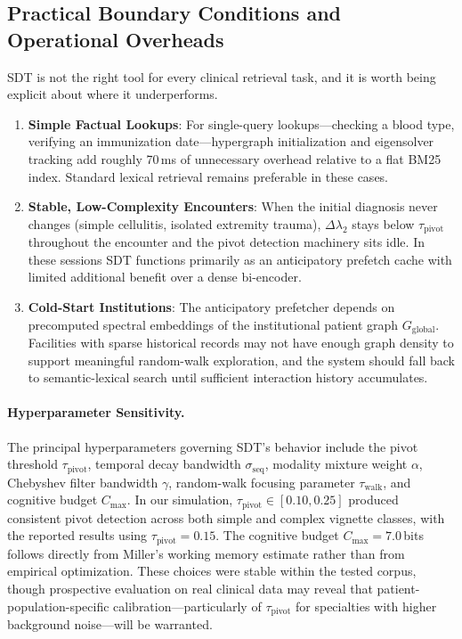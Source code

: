 \documentclass[10pt, onecolumn]{article}
\begin{document}
\subsection{Practical Boundary Conditions and Operational Overheads}

SDT is not the right tool for every clinical retrieval task, and it is worth being explicit about where it underperforms.
\begin{enumerate}[(1)]
  \item \textbf{Simple Factual Lookups}: For single-query lookups---checking a blood type, verifying an immunization date---hypergraph initialization and eigensolver tracking add roughly 70\,ms of unnecessary overhead relative to a flat BM25 index. Standard lexical retrieval remains preferable in these cases.
  \item \textbf{Stable, Low-Complexity Encounters}: When the initial diagnosis never changes (simple cellulitis, isolated extremity trauma), $\Delta \lambda_2$ stays below $\tau_{\text{pivot}}$ throughout the encounter and the pivot detection machinery sits idle. In these sessions SDT functions primarily as an anticipatory prefetch cache with limited additional benefit over a dense bi-encoder.
  \item \textbf{Cold-Start Institutions}: The anticipatory prefetcher depends on precomputed spectral embeddings of the institutional patient graph $G_{\text{global}}$. Facilities with sparse historical records may not have enough graph density to support meaningful random-walk exploration, and the system should fall back to semantic-lexical search until sufficient interaction history accumulates.
\end{enumerate}

\paragraph{Hyperparameter Sensitivity.}
The principal hyperparameters governing SDT's behavior include the pivot threshold $\tau_{\text{pivot}}$, temporal decay bandwidth $\sigma_{\text{seq}}$, modality mixture weight $\alpha$, Chebyshev filter bandwidth $\gamma$, random-walk focusing parameter $\tau_{\text{walk}}$, and cognitive budget $C_{\max}$. In our simulation, $\tau_{\text{pivot}} \in [0.10, 0.25]$ produced consistent pivot detection across both simple and complex vignette classes, with the reported results using $\tau_{\text{pivot}} = 0.15$. The cognitive budget $C_{\max} = 7.0$\,bits follows directly from Miller's working memory estimate \cite{miller1956magical} rather than from empirical optimization. These choices were stable within the tested corpus, though prospective evaluation on real clinical data may reveal that patient-population-specific calibration---particularly of $\tau_{\text{pivot}}$ for specialties with higher background noise---will be warranted.
\end{document}
